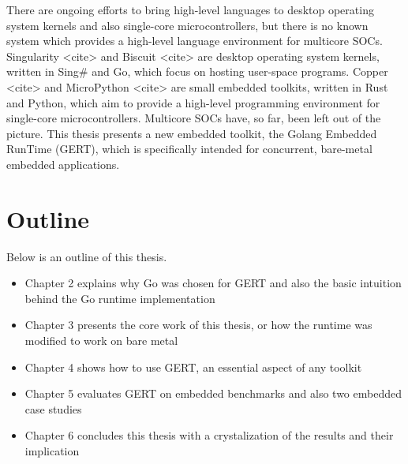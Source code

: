 There are ongoing efforts to bring high-level languages to desktop
operating system kernels and also single-core microcontrollers, but
there is no known system which provides a high-level language environment for
multicore SOCs. Singularity <cite> and Biscuit <cite> are desktop
operating system kernels, written in Sing\# and Go, which focus on
hosting user-space programs. Copper <cite> and MicroPython <cite>
are small embedded toolkits, written in Rust and Python, which aim
to provide a high-level programming environment for single-core
microcontrollers. Multicore SOCs have, so far, been left out of the
picture. This thesis presents a new embedded toolkit, the Golang Embedded
RunTime (GERT), which is specifically intended for concurrent, bare-metal embedded applications.

\section{Outline}
Below is an outline of this thesis.
\begin{itemize}
  \item Chapter 2 explains why Go was chosen for GERT and also the basic intuition behind the Go runtime implementation
  \item Chapter 3 presents the core work of this thesis, or how the runtime was modified to work on bare metal
  \item Chapter 4 shows how to use GERT, an essential aspect of any toolkit
  \item Chapter 5 evaluates GERT on embedded benchmarks and also two embedded case studies
  \item Chapter 6 concludes this thesis with a crystalization of the results and their implication
\end{itemize}
